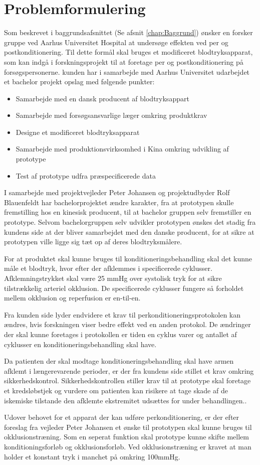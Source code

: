 \chapter{Problemformulering}
Som beskrevet i baggrundsafsnittet (Se afsnit \ref{chap:Baggrund}) ønsker en forsker gruppe ved Aarhus Universitet Hospital at undersøge effekten ved per og postkonditionering. Til dette formål skal bruges et modificeret blodtryksapparat, som kan indgå i forskningsprojekt til at foretage per og postkonditionering på forsøgspersonerne. kunden har i samarbejde med Aarhus Universitet udarbejdet et bachelor projekt opslag med følgende punkter:
\begin{itemize}
	\item Samarbejde med en dansk producent af blodtryksappart
	\item Samarbejde med forsøgsansvarlige læger omkring produktkrav
	\item Designe et modificeret blodtryksapparat
	\item Samarbejde med produktionsvirksomhed i Kina omkring udvikling af prototype 
	\item Test af prototype udfra præspecificerede data
\end{itemize}

I samarbejde med projektvejleder Peter Johansen og projektudbyder Rolf Blauenfeldt har bachelorprojektet ændre karakter, fra at prototypen skulle fremstilling hos en kinesisk producent, til at bachelor gruppen selv fremstiller en prototype. Selvom bachelorgruppen selv udvikler prototypen ønskes det stadig fra kundens side at der bliver samarbejdet med den danske producent, for at sikre at prototypen ville ligge sig tæt op af deres blodtryksmålere.

For at produktet skal kunne bruges til konditioneringsbehandling skal det kunne måle et blodtryk, hvor efter der afklemmes i specificerede cyklusser. Afklemningstrykket skal være 25 mmHg over systolisk tryk for at sikre tilstrækkelig arteriel okklusion. De specificerede cyklusser fungere så forholdet mellem okklusion og reperfusion er en-til-en. 

Fra kunden side lyder endvidere et krav til perkonditioneringsprotokolen kan ændres, hvis forskningen viser bedre effekt ved en anden protokol. De ændringer der skal kunne foretages i protokollen er tiden en cyklus varer og antallet af cyklusser en konditioneringsbehandling skal have. 

Da patienten der skal modtage konditioneringsbehandling skal have armen afklemt i længerevarende perioder, er der fra kundens side stillet et krav omkring sikkerhedskontrol. Sikkerhedskontrollen stiller krav til at prototype skal foretage et kredsløbstjek og vurdere om patienten kan risikere at tage skade af de iskemiske tilstande den afklemte ekstremitet udsættes for under behandlingen..

Udover behovet for et apparat der kan udføre perkonditionering, er der efter foreslag fra vejleder Peter Johansen et ønske til prototypen skal kunne bruges til okklusionstræning. Som en seperat funktion skal prototype kunne skifte mellem konditioningsforløb og okklusionsforløb. Ved okklusionstræning er kravet at man holder et konstant tryk i manchet på omkring 100mmHg. 

